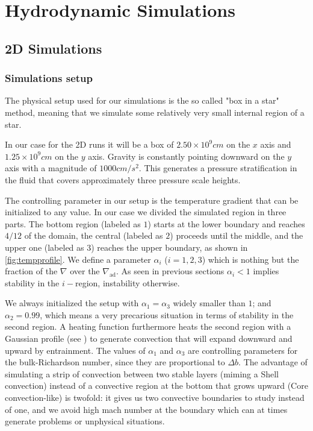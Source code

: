 
\chapter{Hydrodynamic Simulations}
\section{2D Simulations}
\subsection{Simulations setup}
The physical setup used for our simulations is the so called "box in a star" method, meaning that we simulate some relatively very small internal region of a star. 

In our case for the 2D runs it will be a box of $2.50 \times 10^{9} cm$ on the $x$ axis and $1.25 \times 10^{9} cm$ on the $y$ axis. Gravity is constantly pointing downward on the $y$ axis with a magnitude of $1000 cm/s^2$. This generates a pressure stratification in the fluid that covers approximately three pressure scale heights. 

The controlling parameter in our setup is the temperature gradient that can be initialized to any value. In our case we divided the simulated region in three parts. The bottom region (labeled as $1$) starts at the lower boundary and reaches $4/12$ of the domain, the central (labeled as $2$) proceeds until the middle, and the upper one (labeled as $3$) reaches the upper boundary, as shown in \ref{fig:tempprofile}. We define a parameter $\alpha_{i}$ ($i=1, 2, 3$) which is nothing but the fraction of the $\nabla$ over the $\nabla_{\mathrm{ad}}$. As seen in previous sections $\alpha_{i}<1$ implies stability in the $i-$region, instability otherwise. 

We always initialized the setup with $\alpha_{1} = \alpha_{3}$ widely smaller than $1$; and $\alpha_{2}=0.99$, which means a very precarious situation in terms of stability in the second region. A heating function furthermore heats the second region with a Gaussian profile (see \label{fig:tempprofile}) to generate convection that will expand downward and upward by entrainment. The values of $\alpha_{1}$ and $\alpha_{3}$ are controlling parameters for the bulk-Richardson number, since they are proportional to $\Delta b$. The advantage of simulating a strip of convection between two stable layers (miming a Shell convection) instead of a convective region at the bottom that grows upward (Core convection-like) is twofold: it gives us two convective boundaries to study instead of one, and we avoid high mach number at the boundary which can at times generate problems or unphysical situations. 

